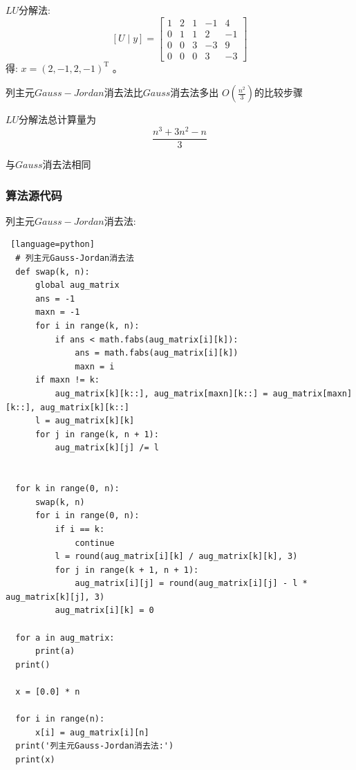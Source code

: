\documentclass[UTF8]{ctexart}
\begin{document}
\quad

$LU$分解法:
$$
  [U \mid y]=\left[\begin{array}{ccccc}
      1 & 2 & 1 & -1 & 4 \\
      0 & 1 & 1 & 2 & -1 \\
      0 & 0 & 3 & -3 & 9 \\
      0 & 0 & 0 & 3 & -3
      \end{array}\right]
$$
得:  $x=(2,-1,2,-1)^{\mathrm{T}}$ 。

列主元$Gauss-Jordan$消去法比$Gauss$消去法多出 $O(\frac{n^2}{3})$的比较步骤

$LU$分解法总计算量为
\begin{equation}\nonumber
    \frac{n^{3}+3 n^{2}-n}{3}
\end{equation}

与$Gauss$消去法相同
\subsubsection{算法源代码}
列主元$Gauss-Jordan$消去法:
\begin{lstlisting} [language=python]
  # 列主元Gauss-Jordan消去法
  def swap(k, n):
      global aug_matrix
      ans = -1
      maxn = -1
      for i in range(k, n):
          if ans < math.fabs(aug_matrix[i][k]):
              ans = math.fabs(aug_matrix[i][k])
              maxn = i
      if maxn != k:
          aug_matrix[k][k::], aug_matrix[maxn][k::] = aug_matrix[maxn][k::], aug_matrix[k][k::]
      l = aug_matrix[k][k]
      for j in range(k, n + 1):
          aug_matrix[k][j] /= l
  
  
  for k in range(0, n):
      swap(k, n)
      for i in range(0, n):
          if i == k:
              continue
          l = round(aug_matrix[i][k] / aug_matrix[k][k], 3)
          for j in range(k + 1, n + 1):
              aug_matrix[i][j] = round(aug_matrix[i][j] - l * aug_matrix[k][j], 3)
          aug_matrix[i][k] = 0
  
  for a in aug_matrix:
      print(a)
  print()
  
  x = [0.0] * n
  
  for i in range(n):
      x[i] = aug_matrix[i][n]
  print('列主元Gauss-Jordan消去法:')
  print(x)
\end{lstlisting}

\quad
\end{document}
